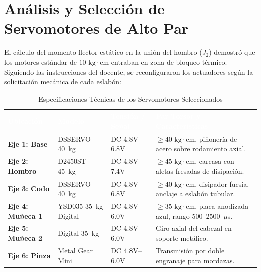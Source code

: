 \documentclass[11pt,a4paper]{article}
\begin{document}
\section{Análisis y Selección de Servomotores de Alto Par}

El cálculo del momento flector estático en la unión del hombro ($J_2$) demostró que los motores estándar de $10\text{ kg}\cdot\text{cm}$ entraban en zona de bloqueo térmico. Siguiendo las instrucciones del docente, se reconfiguraron los actuadores según la solicitación mecánica de cada eslabón:

\begin{table}[H]
\centering
\caption{Especificaciones Técnicas de los Servomotores Seleccionados}
\label{tab:especificaciones_servos}
\small
\begin{tabularx}{\textwidth}{p{3.0cm} p{2.8cm} p{2.5cm} X}
\toprule
\rowcolor{tableheader}
\textcolor{white}{\textbf{Ubicación}} & \textcolor{white}{\textbf{Modelo}} & \textcolor{white}{\textbf{Tensión / Señal}} & \textcolor{white}{\textbf{Par Torsor y Características}} \\
\midrule
\textbf{Eje 1: Base} & DSSERVO 40~kg & DC 4.8V--6.8V & $\ge 40\text{ kg}\cdot\text{cm}$, piñonería de acero sobre rodamiento axial. \\
\rowcolor{tablezebra}
\textbf{Eje 2: Hombro} & D2450ST 45~kg & DC 4.8V--7.4V & $\ge 45\text{ kg}\cdot\text{cm}$, carcasa con aletas fresadas de disipación. \\
\textbf{Eje 3: Codo} & DSSERVO 40~kg & DC 4.8V--6.8V & $\ge 40\text{ kg}\cdot\text{cm}$, disipador fucsia, anclaje a eslabón tubular. \\
\rowcolor{tablezebra}
\textbf{Eje 4: Muñeca 1} & YSD035 35~kg Digital & DC 4.8V--6.0V & $\ge 35\text{ kg}\cdot\text{cm}$, placa anodizada azul, rango 500--2500~$\mu$s. \\
\textbf{Eje 5: Muñeca 2} & Digital 35~kg & DC 4.8V--6.0V & Giro axial del cabezal en soporte metálico. \\
\rowcolor{tablezebra}
\textbf{Eje 6: Pinza} & Metal Gear Mini & DC 4.8V--6.0V & Transmisión por doble engranaje para mordazas. \\
\bottomrule
\end{tabularx}
\end{table}
\end{document}
